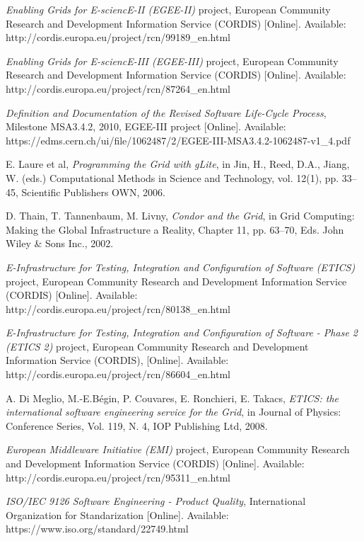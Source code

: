 \documentclass[journal]{IEEEtran}
\begin{document}
\begin{thebibliography}{1}
\emph{Enabling Grids for E-sciencE-II (EGEE-II)} project, European Community
Research and Development Information Service (CORDIS) [Online]. Available:
http://cordis.europa.eu/project/rcn/99189\_en.html

\emph{Enabling Grids for E-sciencE-III (EGEE-III)} project, European Community
Research and Development Information Service (CORDIS) [Online]. Available:
http://cordis.europa.eu/project/rcn/87264\_en.html

\emph{Definition and Documentation of the Revised Software Life-Cycle Process},
Milestone MSA3.4.2, 2010, EGEE-III project [Online]. Available: https://edms.cern.ch/ui/file/1062487/2/EGEE-III-MSA3.4.2-1062487-v1\_4.pdf

E. Laure et al, \emph{Programming the Grid with gLite}, in Jin, H., Reed, D.A.,
Jiang, W. (eds.) Computational Methods in Science and Technology, vol. 12(1),
pp. 33–45, Scientific Publishers OWN, 2006.

D. Thain, T. Tannenbaum, M. Livny, \emph{Condor and the Grid}, in Grid
Computing: Making the Global Infrastructure a Reality, Chapter 11, pp. 63–70,
Eds. John Wiley \& Sons Inc., 2002.

\emph{E-Infrastructure for Testing, Integration and Configuration of Software
(ETICS)} project, European Community Research and Development Information
Service (CORDIS) [Online]. Available: http://cordis.europa.eu/project/rcn/80138\_en.html

\emph{E-Infrastructure for Testing, Integration and Configuration of Software -
Phase 2 (ETICS 2)} project, European Community Research and Development
Information Service (CORDIS), [Online]. Available: http://cordis.europa.eu/project/rcn/86604\_en.html

A. Di Meglio, M.-E.Bégin, P. Couvares, E. Ronchieri, E. Takacs, \emph{ETICS:
the international software engineering service for the Grid}, in Journal of
Physics: Conference Series, Vol. 119, N. 4, IOP Publishing Ltd, 2008.

\emph{European Middleware Initiative (EMI)} project, European Community
Research and Development Information Service (CORDIS) [Online]. Available:
http://cordis.europa.eu/project/rcn/95311\_en.html

\emph{ISO/IEC 9126 Software Engineering - Product Quality}, International
Organization for Standarization [Online]. Available: https://www.iso.org/standard/22749.html


\end{thebibliography}
\end{document}
